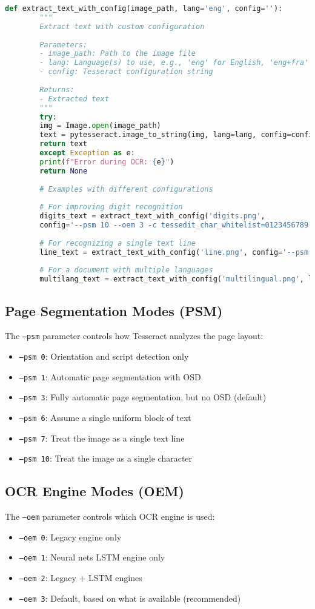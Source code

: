 \documentclass{book}
\begin{document}
	\begin{lstlisting}[language=Python]
		def extract_text_with_config(image_path, lang='eng', config=''):
		"""
		Extract text with custom configuration
		
		Parameters:
		- image_path: Path to the image file
		- lang: Language(s) to use, e.g., 'eng' for English, 'eng+fra' for English and French
		- config: Tesseract configuration string
		
		Returns:
		- Extracted text
		"""
		try:
		img = Image.open(image_path)
		text = pytesseract.image_to_string(img, lang=lang, config=config)
		return text
		except Exception as e:
		print(f"Error during OCR: {e}")
		return None
		
		# Examples with different configurations
		
		# For improving digit recognition
		digits_text = extract_text_with_config('digits.png', 
		config='--psm 10 --oem 3 -c tessedit_char_whitelist=0123456789')
		
		# For recognizing a single text line
		line_text = extract_text_with_config('line.png', config='--psm 7')
		
		# For a document with multiple languages
		multilang_text = extract_text_with_config('multilingual.png', lang='eng+fra+deu')
	\end{lstlisting}
	
	\subsection{Page Segmentation Modes (PSM)}
	The \texttt{--psm} parameter controls how Tesseract analyzes the page layout:
	\begin{itemize}
		\item \texttt{--psm 0}: Orientation and script detection only
		\item \texttt{--psm 1}: Automatic page segmentation with OSD
		\item \texttt{--psm 3}: Fully automatic page segmentation, but no OSD (default)
		\item \texttt{--psm 6}: Assume a single uniform block of text
		\item \texttt{--psm 7}: Treat the image as a single text line
		\item \texttt{--psm 10}: Treat the image as a single character
	\end{itemize}
	
	\subsection{OCR Engine Modes (OEM)}
	The \texttt{--oem} parameter controls which OCR engine is used:
	\begin{itemize}
		\item \texttt{--oem 0}: Legacy engine only
		\item \texttt{--oem 1}: Neural nets LSTM engine only
		\item \texttt{--oem 2}: Legacy + LSTM engines
		\item \texttt{--oem 3}: Default, based on what is available (recommended)
	\end{itemize}
	
\end{document}
